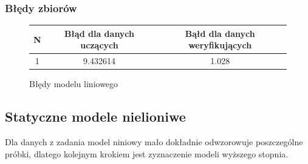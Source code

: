 \documentclass[a4paper, 11pt]{article}
\begin{document}
\subsubsection{Błędy zbiorów}

\begin{figure}[H]
\centering
\begin{tabular}{|c|c|c|}
\hline
	N & Błąd dla danych uczących & Bąłd dla danych weryfikujących\\
\hline
	1 & 9.432614 & 1.028\\
\hline
\end{tabular}
\caption{Błędy modelu liniowego}
\end{figure}
\subsection{Statyczne modele nielioniwe}
Dla danych z zadania model niniowy mało dokładnie odwzorowuje poszczególne próbki, dlatego kolejnym krokiem jest zyznaczenie modeli wyższego stopnia. 
\end{document}
